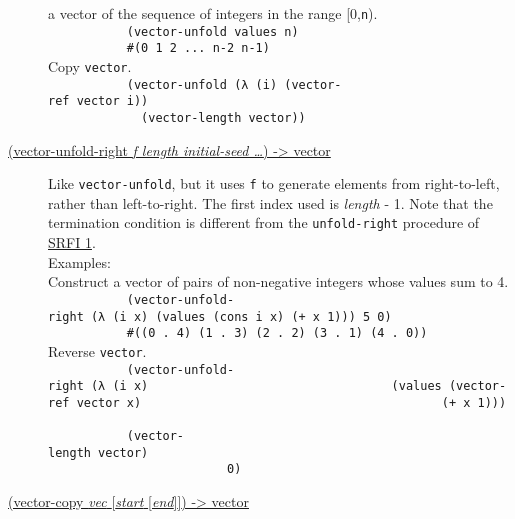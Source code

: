 \begin{description}
a vector of the sequence of integers in the range {[}0,\texttt{n}).\\
\texttt{\ \ \ \ \ \ \ \ \ \ \ (vector-unfold\ values\ n)\ \ \ \ \ \ \ \ \ }\\
\texttt{\ \ \ \ \ \ \ \ \ \ \ \#(0\ 1\ 2\ ...\ n-2\ n-1)\ \ \ \ \ \ \ \ \ }\\[2\baselineskip]Copy
\texttt{vector}.\\[2\baselineskip]\texttt{\ \ \ \ \ \ \ \ \ \ \ (vector-unfold\ (λ\ (i)\ (vector-ref\ vector\ i))\ \ \ \ \ \ \ \ \ \ \ ~~~~~~~~~~\ \ \ \ \ \ \ \ \ \ \ ~~~~~\ \ \ \ \ \ \ \ \ \ \ \ \ \ \ \ \ \ \ \ \ \ \ \ \ \ (vector-length\ vector))\ \ \ \ \ \ \ \ \ }\\[2\baselineskip]
\item[ \href{}{(vector-unfold-right \emph{f length initial-seed
\ldots{}}) -\textgreater{} vector} ]
Like \texttt{vector-unfold}, but it uses \texttt{f} to generate elements
from right-to-left, rather than left-to-right. The first index used is
\emph{length} - 1. Note that the termination condition is different from
the \texttt{unfold-right} procedure of
\protect\hyperlink{SRFIux5cux25201}{SRFI
1}.\\[2\baselineskip]Examples:\\[2\baselineskip]Construct a vector of
pairs of non-negative integers whose values sum to
4.\\[2\baselineskip]\texttt{\ \ \ \ \ \ \ \ \ \ \ (vector-unfold-right\ (λ\ (i\ x)\ (values\ (cons\ i\ x)\ (+\ x\ 1)))\ 5\ 0)\ \ \ \ \ \ \ \ \ }\\
\texttt{\ \ \ \ \ \ \ \ \ \ \ \#((0\ .\ 4)\ (1\ .\ 3)\ (2\ .\ 2)\ (3\ .\ 1)\ (4\ .\ 0))\ \ \ \ \ \ \ \ \ }\\[2\baselineskip]Reverse
\texttt{vector}.\\[2\baselineskip]\texttt{\ \ \ \ \ \ \ \ \ \ \ (vector-unfold-right\ (λ\ (i\ x)\ \ \ \ \ \ \ \ \ \ \ \ \ \ \ \ \ \ \ \ \ \ \ \ \ \ \ \ \ \ \ \ \ \ (values\ (vector-ref\ vector\ x)\ \ \ \ \ \ \ \ \ \ \ \ \ \ \ \ \ \ \ \ \ \ \ \ \ \ \ \ \ \ \ \ \ \ \ \ \ \ \ \ \ \ (+\ x\ 1)))\ \ \ \ \ \ \ \ \ \ \ ~~~~~~~~~~\ \ \ \ \ \ \ \ \ \ \ ~~~~~~~~~~~\ \ \ \ \ \ \ \ \ \ \ \ \ \ \ \ \ \ \ \ \ \ \ \ \ \ \ \ \ \ \ \ (vector-length\ vector)\ \ \ \ \ \ \ \ \ \ \ ~~~~~~~~~~\ \ \ \ \ \ \ \ \ \ \ ~~~~~~~~~~~\ \ \ \ \ \ \ \ \ \ \ \ \ \ \ \ \ \ \ \ \ \ \ \ \ \ \ \ \ \ \ \ 0)\ \ \ \ \ \ \ \ \ }\\[2\baselineskip]
\item[ \href{}{(vector-copy \emph{vec} {[}\emph{start}
{[}\emph{end}{]}{]}) -\textgreater{} vector} ]

\end{description}
